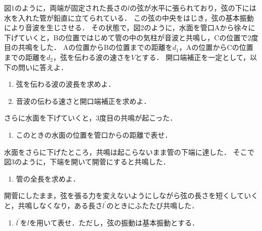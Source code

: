 \setcounter{figure}{0}
図1のように，両端が固定された長さの$l$の弦が水平に張られており，弦の下には水を入れた管が鉛直に立てられている．
この弦の中央をはじき，弦の基本振動により音波を生じさせる．
その状態で，図2のように，水面を管口Aから徐々に下げていくと，Bの位置ではじめて管の中の気柱が音波と共鳴し，Cの位置で2度目の共鳴をした．
Aの位置からBの位置までの距離を$d_1$，Aの位置からCの位置までの距離を$d_2$，弦を伝わる波の速さを$V$とする．
開口端補正を一定として，以下の問いに答えよ．

\begin{enumerate}[（1）]
  \setlength{\leftskip}{-1.5zw}
  \setlength{\itemindent}{1zw}\setlength{\labelsep}{0.5zw}
  \setlength{\labelwidth}{1zw}\setlength{\leftmargin}{1zw}
  \setlength{\itemsep}{0.5\baselineskip}
  \item 弦を伝わる波の波長を求めよ．
  \item 音波の伝わる速さと開口端補正を求めよ．
\end{enumerate}

さらに水面を下げていくと，3度目の共鳴が起こった．

\begin{enumerate}[（1）]
  \setlength{\leftskip}{-1.5zw}
  \setlength{\itemindent}{1zw}\setlength{\labelsep}{0.5zw}
  \setlength{\labelwidth}{1zw}\setlength{\leftmargin}{1zw}
  \setlength{\itemsep}{0.5\baselineskip}
  \addtocounter{enumi}{2}
  \item このときの水面の位置を管口からの距離で表せ．
\end{enumerate}

水面をさらに下げたところ，共鳴は起こらないまま管の下端に達した．
そこで図3のように，下端を開いて開菅にすると共鳴した．

\begin{enumerate}[（1）]
  \setlength{\leftskip}{-1.5zw}
  \setlength{\itemindent}{1zw}\setlength{\labelsep}{0.5zw}
  \setlength{\labelwidth}{1zw}\setlength{\leftmargin}{1zw}
  \setlength{\itemsep}{0.5\baselineskip}
  \addtocounter{enumi}{3}
  \item 管の全長を求めよ．
\end{enumerate}

開菅にしたまま，弦を張る力を変えないようにしながら弦の長さを短くしていくと，共鳴しなくなり，ある長さ$l^\prime$のときにふたたび共鳴した．

\begin{enumerate}[（1）]
  \setlength{\leftskip}{-1.5zw}
  \setlength{\itemindent}{1zw}\setlength{\labelsep}{0.5zw}
  \setlength{\labelwidth}{1zw}\setlength{\leftmargin}{1zw}
  \setlength{\itemsep}{0.5\baselineskip}
  \addtocounter{enumi}{4}
  \item $l^\prime$を$l$を用いて表せ．ただし，弦の振動は基本振動とする．
\end{enumerate}

